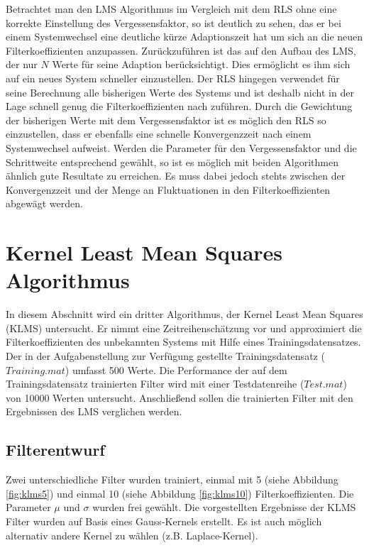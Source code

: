 Betrachtet man den LMS Algorithmus im Vergleich mit dem RLS ohne eine korrekte Einstellung des Vergessensfaktor, so ist deutlich zu sehen, das er bei einem Systemwechsel eine deutliche kürze Adaptionszeit hat um sich an die neuen Filterkoeffizienten anzupassen.
Zurückzuführen ist das auf den Aufbau des LMS, der nur $N$ Werte für seine Adaption berücksichtigt.
Dies ermöglicht es ihm sich auf ein neues System schneller einzustellen.
Der RLS hingegen verwendet für seine Berechnung alle bisherigen Werte des Systems und ist deshalb nicht in der Lage schnell genug die Filterkoeffizienten nach zuführen.
Durch die Gewichtung der bisherigen Werte mit dem Vergessensfaktor ist es möglich den RLS so einzustellen, dass er ebenfalls eine schnelle Konvergenzzeit nach einem Systemwechsel aufweist.
Werden die Parameter für den Vergessensfaktor und die Schrittweite entsprechend gewählt, so ist es möglich mit beiden Algorithmen ähnlich gute Resultate zu erreichen.
Es muss dabei jedoch stehts zwischen der Konvergenzzeit und der Menge an Fluktuationen in den Filterkoeffizienten abgewägt werden.






\section{Kernel Least Mean Squares Algorithmus}
\label{sec:klms}

In diesem Abschnitt wird ein dritter Algorithmus, der Kernel Least Mean Squares (KLMS) untersucht.
Er nimmt eine Zeitreihenschätzung vor und approximiert die Filterkoeffizienten des unbekannten Systems mit Hilfe eines Trainingsdatensatzes.
Der in der Aufgabenstellung zur Verfügung gestellte Trainingsdatensatz ($Training.mat$) umfasst 500 Werte.
Die Performance der auf dem Trainingsdatensatz trainierten Filter wird mit einer Testdatenreihe ($Test.mat$) von 10000 Werten untersucht.
Anschließend sollen die trainierten Filter mit den Ergebnissen des LMS verglichen werden.


\subsection{Filterentwurf}

Zwei unterschiedliche Filter wurden trainiert, einmal mit 5 (siehe Abbildung \ref{fig:klms5}) und einmal 10 (siehe Abbildung \ref{fig:klms10}) Filterkoeffizienten.
Die Parameter $\mu$ und $\sigma$ wurden frei gewählt.
Die vorgestellten Ergebnisse der KLMS Filter wurden auf Basis eines Gauss-Kernels erstellt.
Es ist auch möglich alternativ andere Kernel  zu wählen (z.B. Laplace-Kernel).


